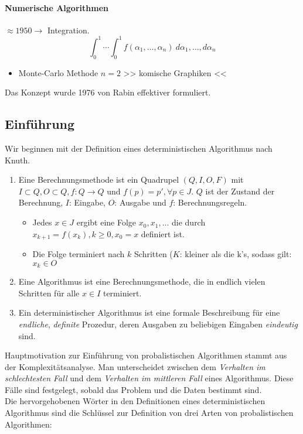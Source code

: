\documentclass[a4paper,twoside,DIV15,BCOR12mm]{scrbook}
\begin{document}
\paragraph{Numerische Algorithmen} $\approx 1950 \rightarrow $ Integration.\\
$$ \int_0^1 \cdots \int_0^1 f(\alpha_1, \dots, \alpha_n) \ d \alpha_1, \dots, d \alpha_n $$

\begin{itemize}
\item Monte-Carlo Methode $n=2$
>> komische Graphiken <<
\end{itemize}

Das Konzept wurde 1976 von Rabin effektiver formuliert.

\subsection{Einführung}
Wir beginnen mit der Definition eines deterministischen Algorithmus nach Knuth.

\begin{enumerate}
\item Eine Berechnungsmethode ist ein Quadrupel $( Q,I,O,F )$ mit $ I \subset Q, O \subset Q, f: Q \rightarrow Q$
und $f(p) = p' , \forall p \in J$. $Q$ ist der Zustand der Berechnung, $I$: Eingabe, $O$: Ausgabe und $f$:
Berechnungsregeln.
\begin{itemize}
\item Jedes $x \in J$ ergibt eine Folge $x_0, x_1, \dots$ die durch $x_{k+1} = f(x_k), k \geq 0, x_0 = x$ definiert ist.
\item Die Folge terminiert nach $k$ Schritten ($K$: kleiner als die k's, sodass gilt: $x_k \in O$
\end{itemize}
\item Eine Algorithmus ist eine Berechnungsmethode, die in endlich vielen Schritten für alle $x \in I$ terminiert.
\item Ein deterministischer Algorithmus ist eine formale Beschreibung für eine \emph{endliche}, \emph{definite} Prozedur, deren Ausgaben zu beliebigen Eingaben \emph{eindeutig} sind.
\end{enumerate}

Hauptmotivation zur Einführung von probalistischen Algorithmen stammt aus der Komplexitätsanalyse. Man unterscheidet zwischen dem 
\emph{Verhalten im schlechtesten Fall} und dem \emph{Verhalten im mittleren Fall} eines Algorithmus. Diese Fälle sind festgelegt, sobald das Problem und die Daten bestimmt sind.\\
Die hervorgehobenen Wörter in den Definitionen eines deterministischen Algorithmus sind die Schlüssel zur Definition von drei Arten von probalistischen Algorithmen:
\end{document}
